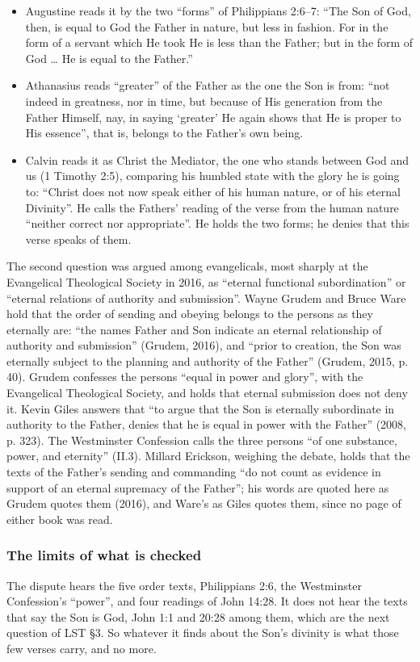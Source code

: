 \documentclass[11pt,paper=\testimonypaper,DIV=13,parskip=false]{scrartcl}
\begin{document}
\begin{itemize}
  \item Augustine reads it by the two “forms” of Philippians 2:6–7: “The Son of God, then, is equal to God the Father in nature, but less in fashion. For in the form of a servant which He took He is less than the Father; but in the form of God … He is equal to the Father.”
  \item Athanasius reads “greater” of the Father as the one the Son is from: “not indeed in greatness, nor in time, but because of His generation from the Father Himself, nay, in saying ‘greater’ He again shows that He is proper to His essence”, that is, belongs to the Father’s own being.
  \item Calvin reads it as Christ the Mediator, the one who stands between God and us (1 Timothy 2:5), comparing his humbled state with the glory he is going to: “Christ does not now speak either of his human nature, or of his eternal Divinity”. He calls the Fathers’ reading of the verse from the human nature “neither correct nor appropriate”. He holds the two forms; he denies that this verse speaks of them.
\end{itemize}
The second question was argued among evangelicals, most sharply at the Evangelical Theological Society in 2016, as “eternal functional subordination” or “eternal relations of authority and submission”. Wayne Grudem and Bruce Ware hold that the order of sending and obeying belongs to the persons as they eternally are: “the names Father and Son indicate an eternal relationship of authority and submission” (Grudem, 2016), and “prior to creation, the Son was eternally subject to the planning and authority of the Father” (Grudem, 2015, p. 40). Grudem confesses the persons “equal in power and glory”, with the Evangelical Theological Society, and holds that eternal submission does not deny it. Kevin Giles answers that “to argue that the Son is eternally subordinate in authority to the Father, denies that he is equal in power with the Father” (2008, p. 323). The Westminster Confession calls the three persons “of one substance, power, and eternity” (II.3). Millard Erickson, weighing the debate, holds that the texts of the Father’s sending and commanding “do not count as evidence in support of an eternal supremacy of the Father”; his words are quoted here as Grudem quotes them (2016), and Ware’s as Giles quotes them, since no page of either book was read.

\subsubsection*{The limits of what is checked}
The dispute hears the five order texts, Philippians 2:6, the Westminster Confession’s “power”, and four readings of John 14:28. It does not hear the texts that say the Son is God, John 1:1 and 20:28 among them, which are the next question of LST §3. So whatever it finds about the Son’s divinity is what those few verses carry, and no more.
\end{document}
